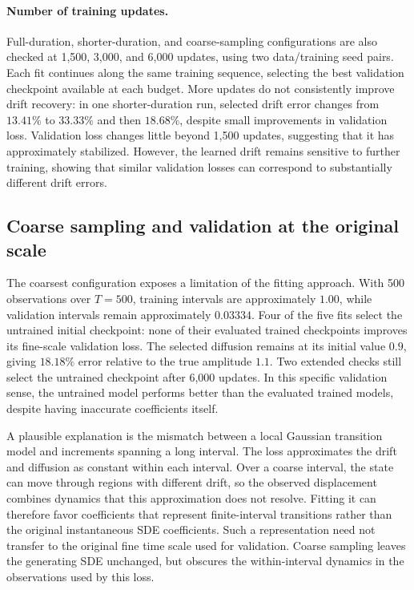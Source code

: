 \paragraph{Number of training updates.}
Full-duration, shorter-duration, and coarse-sampling configurations are also
checked at 1,500, 3,000, and 6,000 updates, using two data/training seed pairs.
Each fit continues along the same training sequence, selecting the best
validation checkpoint available at each budget. More updates do not
consistently improve drift recovery: in one shorter-duration run, selected
drift error changes from $13.41\%$ to $33.33\%$ and then $18.68\%$, despite
small improvements in validation loss. Validation loss changes little beyond
1,500 updates, suggesting that it has approximately stabilized. However, the
learned drift remains sensitive to further training, showing that similar
validation losses can correspond to substantially different drift errors.

\subsection{Coarse sampling and validation at the original scale}

The coarsest configuration exposes a limitation of the fitting approach.
With 500 observations over $T=500$, training intervals are approximately
$1.00$, while validation intervals remain approximately $0.03334$.
Four of the five fits select the untrained initial checkpoint: none of their
evaluated trained checkpoints improves its fine-scale validation loss.
The selected diffusion remains at its initial value $0.9$, giving
$18.18\%$ error relative to the true amplitude $1.1$. Two extended checks
still select the untrained checkpoint after 6,000 updates. In this specific
validation sense, the untrained model performs better than the evaluated
trained models, despite having inaccurate coefficients itself.

A plausible explanation is the mismatch between a local Gaussian transition
model and increments spanning a long interval. The loss approximates the drift
and diffusion as constant within each interval. Over a coarse interval, the
state can move through regions with different drift, so the observed
displacement combines dynamics that this approximation does not resolve.
Fitting it can therefore favor coefficients that represent finite-interval
transitions rather than the original instantaneous SDE coefficients. Such a
representation need not transfer to the original fine time scale used for
validation. Coarse sampling leaves the generating SDE unchanged, but obscures
the within-interval dynamics in the observations used by this loss.

